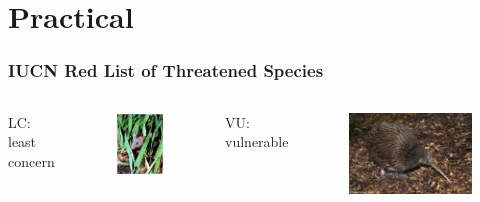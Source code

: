 
\section{Practical}

\begin{frame}
        \frametitle{IUCN Red List of Threatened Species}

        \begin{columns}
                LC: least concern
                \begin{figure}
                        \includegraphics[height=0.2\textheight]{Pics/LC}
                \end{figure}
                VU: vulnerable
                \begin{figure}
                        \includegraphics[height=0.2\textheight]{Pics/VU}

\end{figure}
\end{columns}
\end{frame}
